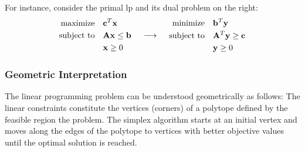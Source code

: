 For instance, consider the primal \gls{lp} and its dual problem on the right:
\[
    \begin{array}{c@{\quad}c@{\quad}c}
        \begin{aligned}
            \text{maximize} \quad   & \mathbf{c}^T \mathbf{x}               \\
            \text{subject to} \quad & \mathbf{A} \mathbf{x} \leq \mathbf{b} \\
                                    & \mathbf{x} \geq 0                     \\
        \end{aligned}
         &
        \begin{array}{c}
            \longrightarrow
        \end{array}
         &
        \begin{aligned}
            \text{minimize} \quad   & \mathbf{b}^T \mathbf{y}                 \\
            \text{subject to} \quad & \mathbf{A}^T \mathbf{y} \geq \mathbf{c} \\
                                    & \mathbf{y} \geq 0                       \\
        \end{aligned}
    \end{array}
\]

\subsubsection{Geometric Interpretation}
The linear programming problem can be understood geometrically as follows:
The linear constraints constitute the vertices (corners) of a polytope
defined by the feasible region the problem.
The simplex algorithm starts at an initial vertex and moves along
the edges of the polytope to vertices with better objective
values until the optimal solution is reached.

